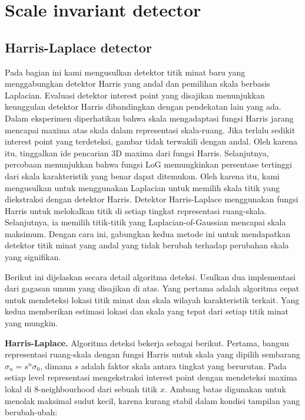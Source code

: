 \section{Scale invariant detector}

\subsection{Harris-Laplace detector}
Pada bagian ini kami mengusulkan detektor titik minat baru yang menggabungkan detektor Harris yang andal dan pemilihan skala berbasis Laplacian. Evaluasi detektor interest point yang disajikan menunjukkan keunggulan detektor Harris dibandingkan dengan pendekatan lain yang ada. Dalam eksperimen diperhatikan bahwa skala mengadaptasi fungsi Harris jarang mencapai maxima atas skala dalam representasi skala-ruang. Jika terlalu sedikit interest point yang terdeteksi, gambar tidak terwakili dengan andal. Oleh karena itu, tinggalkan ide pencarian 3D maxima dari fungsi Harris. Selanjutnya, percobaan menunjukkan bahwa fungsi LoG memungkinkan persentase tertinggi dari skala karakteristik yang benar dapat ditemukan. Oleh karena itu, kami mengusulkan untuk menggunakan Laplacian untuk memilih skala titik yang diekstraksi dengan detektor Harris. Detektor Harris-Laplace menggunakan fungsi Harris untuk melokalkan titik di setiap tingkat representasi ruang-skala. Selanjutnya, ia memilih titik-titik yang Laplacian-of-Gaussian mencapai skala maksimum. Dengan cara ini, gabungkan kedua metode ini untuk mendapatkan detektor titik minat yang andal yang tidak berubah terhadap perubahan skala yang signifikan.

Berikut ini dijelaskan secara detail algoritma deteksi. Usulkan dua implementasi dari gagasan umum yang disajikan di atas. Yang pertama adalah algoritma cepat untuk mendeteksi lokasi titik minat dan skala wilayah karakteristik terkait. Yang kedua memberikan estimasi lokasi dan skala yang tepat dari setiap titik minat yang mungkin.

\textbf{Harris-Laplace.} Algoritma deteksi bekerja sebagai berikut. Pertama, bangun representasi ruang-skala dengan fungsi Harris untuk skala yang dipilih sembarang \(\sigma_{n} = s ^{n}\sigma_{0}\), dimana \(s\) adalah faktor skala antara tingkat yang berurutan. Pada setiap level representasi mengekstraksi interest point dengan mendeteksi maxima lokal di 8-neighbourhood dari sebuah titik \(x\). Ambang batas digunakan untuk menolak maksimal sudut kecil, karena kurang stabil dalam kondisi tampilan yang berubah-ubah:

